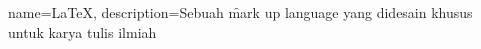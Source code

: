 %
%
%
%

\var{\bslash}{$\setminus$}


\makeglossaries

{
	name=\LaTeX,
	description={Sebuah \f{mark up language} yang didesain khusus untuk karya tulis ilmiah}
}

